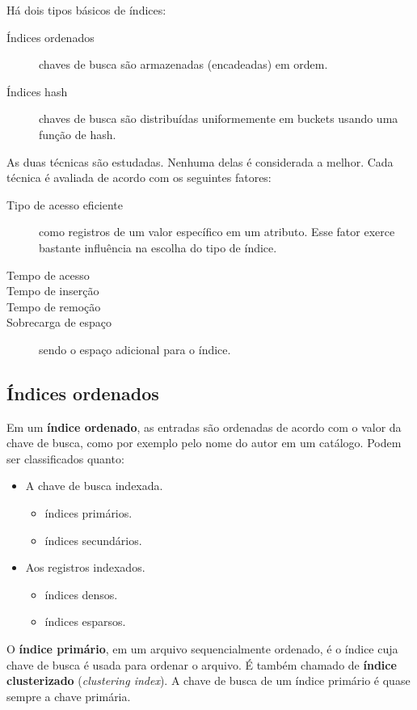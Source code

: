 Há dois tipos básicos de índices:
\begin{description}
\item[Índices ordenados] chaves de busca são armazenadas (encadeadas) em ordem.
\item[Índices hash]  chaves de busca são distribuídas uniformemente
em buckets usando uma função de hash.
\end{description}

As duas técnicas são estudadas. 
Nenhuma delas é considerada a melhor. 
Cada técnica é avaliada de acordo com os seguintes fatores:
\begin{description}
\item[Tipo de acesso eficiente]  como registros de um valor específico em um atributo. Esse fator
exerce bastante influência na escolha do tipo de índice.
\item[Tempo de acesso]
\item[Tempo de inserção]
\item[Tempo de remoção]
\item[Sobrecarga de espaço] sendo o espaço adicional para o índice.
\end{description}

\subsection{Índices ordenados}

Em um \textbf{índice ordenado}, as entradas são ordenadas de acordo
com o valor da chave de busca, como por exemplo pelo nome do autor em um catálogo.
Podem ser classificados quanto:
\begin{itemize}
\item A chave de busca indexada.
	\begin{itemize}
	\item índices primários.
	\item índices secundários.
	\end{itemize}
\item Aos registros indexados.
	\begin{itemize}
	\item índices densos.
	\item índices esparsos.
	\end{itemize}
\end{itemize}

O \textbf{índice primário}, em um arquivo sequencialmente ordenado, é o índice
cuja chave de busca é usada para ordenar o arquivo.
É também chamado de \textbf{índice clusterizado} (\emph{clustering index}).
A chave de busca de um índice primário é quase sempre a chave primária.

